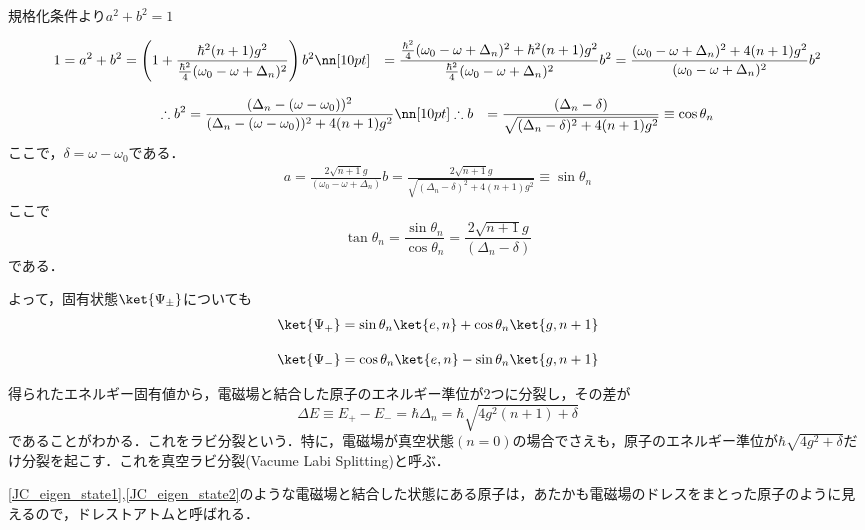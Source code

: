 規格化条件より$a^2+b^2=1$

\begin{align}
    1&=a^2+b^2=\left(
    1+\frac{\hbar^2(n+1)g^2}{\frac{\hbar^2}{4}(\omega_0-\omega+\Delta_n)^2}
    \right)b^2\nn[10pt]
    &=
    \frac{\frac{\hbar^2}{4}(\omega_0-\omega+\Delta_n)^2+\hbar^2(n+1)g^2}{\frac{\hbar^2}{4}(\omega_0-\omega+\Delta_n)^2}
    b^2
    =\frac{(\omega_0-\omega+\Delta_n)^2+4(n+1)g^2}{(\omega_0-\omega+\Delta_n)^2}
    b^2
    \end{align}
    
    \begin{align}
    \therefore 
    b^2&=\frac{(\Delta_n-(\omega-\omega_0))^2}{(\Delta_n-(\omega-\omega_0))^2+4(n+1)g^2}\nn[10pt]
    \therefore 
    b&=\frac{(\Delta_n-\delta)}{\sqrt{(\Delta_n-\delta)^2+4(n+1)g^2}}
    \equiv\cos\theta_n
\end{align}
ここで，$\delta=\omega-\omega_0$である．
\begin{align}
    a=\frac{2\sqrt{n+1}g}{(\omega_0-\omega+\Delta_n)}b
    =\frac{2\sqrt{n+1}g}
    {\sqrt{(\Delta_n-\delta)^2+4(n+1)g^2}}
    \equiv\sin\theta_n
\end{align}
ここで
\begin{equation}
    \tan\theta_n
    =\frac{\sin{\theta_n}}{\cos{\theta_n}}
    =\frac{2\sqrt{n+1}g}{(\Delta_n-\delta)}
\end{equation}
である．

よって，固有状態$\ket{\Psi_{\pm}}$についても
\begin{align}\label{JC_eigen_state1}
    \ket{\Psi_+}&=\sin{\theta_n}\ket{e,n}+\cos\theta_n\ket{g,n+1}\\[10pt]
    \label{JC_eigen_state2}
    \ket{\Psi_-}&=\cos{\theta_n}\ket{e,n}-\sin\theta_n\ket{g,n+1}
\end{align}

得られたエネルギー固有値から，電磁場と結合した原子のエネルギー準位が2つに分裂し，その差が
\begin{equation}
    \Delta E\equiv　E_+-E_-=\hbar\Delta_n=\hbar\sqrt{4g^2(n+1)+\delta}
\end{equation}
であることがわかる．これをラビ分裂という．特に，電磁場が真空状態$(n=0)$の場合でさえも，原子のエネルギー準位が$\hbar\sqrt{4g^2+\delta}$だけ分裂を起こす．これを真空ラビ分裂(Vacume Labi Splitting)と呼ぶ．

\eqref{JC_eigen_state1},\eqref{JC_eigen_state2}のような電磁場と結合した状態にある原子は，あたかも電磁場のドレスをまとった原子のように見えるので，ドレストアトムと呼ばれる．




